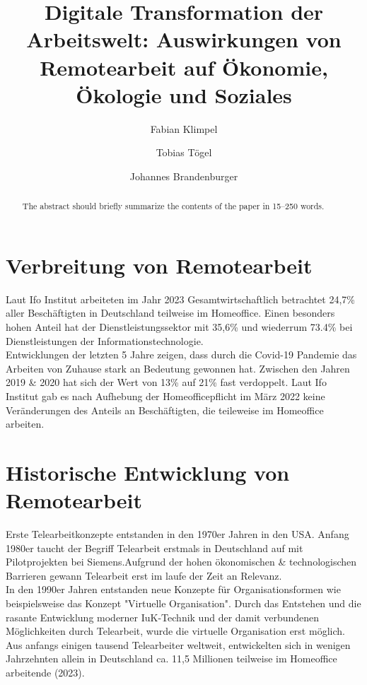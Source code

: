 \documentclass[runningheads]{llncs}
\begin{document}
\title{Digitale Transformation der Arbeitswelt: Auswirkungen von Remotearbeit auf Ökonomie, Ökologie und Soziales}


\author{Fabian Klimpel\orcidID{} \and
Tobias Tögel\orcidID{} \and
Johannes Brandenburger\orcidID{}}
%


\maketitle

\begin{abstract}
The abstract should briefly summarize the contents of the paper in
15--250 words.


\end{abstract}

\section{Verbreitung von Remotearbeit}
Laut Ifo Institut arbeiteten im Jahr 2023 Gesamtwirtschaftlich betrachtet 24,7\% aller Beschäftigten in Deutschland teilweise im Homeoffice\cite{ifo23}. Einen besonders hohen Anteil hat der Dienstleistungssektor mit 35,6\%\cite{ifo23} und wiederrum 73.4\% bei Dienstleistungen der Informationstechnologie\cite{ifo23}.\\
Entwicklungen der letzten 5 Jahre zeigen, dass durch die Covid-19 Pandemie das Arbeiten von Zuhause stark an Bedeutung gewonnen hat. Zwischen den Jahren 2019 \& 2020 hat sich der Wert von 13\% auf 21\% fast verdoppelt\cite{statis23}. Laut Ifo Institut gab es nach Aufhebung der Homeofficepflicht im März 2022 keine Veränderungen des Anteils an Beschäftigten, die teileweise im Homeoffice arbeiten\cite{ifo23}.

\section{Historische Entwicklung von Remotearbeit}
Erste Telearbeitkonzepte entstanden in den 1970er Jahren in den USA\cite{Dangelmaier.1999}. Anfang 1980er taucht der Begriff Telearbeit erstmals in Deutschland auf mit Pilot\-projekten bei Siemens\cite{Dangelmaier.1999}.Aufgrund der hohen ökonomischen \& technologischen Barrieren gewann Telearbeit erst im laufe der Zeit an Relevanz\cite{Dangelmaier.1999}.\\
In den 1990er Jahren entstanden neue Konzepte für Organisationsformen wie beispielsweise das Konzept "Virtuelle Organisation"\cite{Siedenbiedel.2020}. Durch das Entstehen und die rasante Entwicklung moderner IuK-Technik und der damit verbundenen Möglichkeiten durch Telearbeit, wurde die virtuelle Organisation erst möglich\cite{Siedenbiedel.2020}.
Aus anfangs einigen tausend Telearbeiter weltweit, entwickelten sich in wenigen Jahrzehnten allein in Deutschland ca. 11,5 Millionen teilweise im Homeoffice arbeitende (2023)\cite{statis24, ifo23}.
\end{document}
